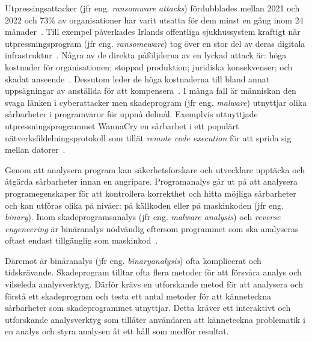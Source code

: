 Utpressingsattacker (jfr eng. \emph{ransomware attacks}) fördubblades
mellan 2021 och 2022 och 73\% av organisationer har varit utsatta för dem
minst en gång inom 24 månader~\cite{cyberreason2021,
    cyberreason2022}. Till exempel påverkades Irlands offentliga sjukhussystem
kraftigt när utpressningsprogram (jfr eng. \emph{ransomeware}) tog över en stor del av deras digitala
infrastruktur~\cite{hse_report, gallagher2023}. Några av de direkta påföljderna
av en lyckad attack är: höga kostnader för organisationen; stoppad
produktion; juridiska konsekvenser; och skadat
anseende~\cite{cyberreason2021, cyberreason2022}. Dessutom leder de höga
kostnaderna till bland annat uppsägningar av anställda för att
kompensera~\cite{cyberreason2021, cyberreason2022}. I många fall är människan
den svaga länken i cyberattacker men skadeprogram (jfr eng.
\emph{malware}) utnyttjar olika sårbarheter i programvaror för uppnå delmål.
Exemplvis uttnyttjade utpressningsprogrammet WannaCry en
sårbarhet i ett populärt nätverksfildelningsprotokoll som tillät \emph{remote
    code execution} för att sprida sig mellan
datorer~\cite{alraddadicomprehensive}.

Genom att analysera program kan säkerhetsforskare och utvecklare upptäcka och
åtgärda sårbarheter innan en angripare. Programanalys går ut på att analysera
programegenskaper för att kontrollera korrekthet och hitta möjliga sårbarheter
och kan utföras olika på nivåer: på källkoden eller på maskinkoden (jfr eng.
\emph{binary}). Inom skadeprogramsanalys (jfr eng. \emph{malware analysis}) och
\emph{reverse engeneering} är binäranalys nödvändig eftersom programmet som ska
analyseras oftast endast tillgänglig som maskinkod~\cite{andriesse2018}.


Däremot är binäranalys (jfr eng. \emph{binaryanalysis}) ofta komplicerat och
tidskrävande. Skadeprogram tilltar ofta flera metoder för att försvåra
analys och vilseleda analysverktyg. Därför krävs en utforskande metod för att
analysera och förstå ett skadeprogram och testa ett antal metoder för att känneteckna 
sårbarheter som skadeprogrammet utnyttjar. Detta kräver ett
interaktivt och utforskande analysverktyg som tillåter användaren att
känneteckna problematik i en analys och styra analysen åt ett håll som medför
resultat.

